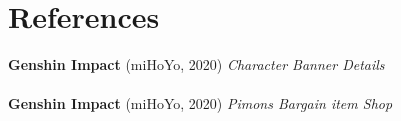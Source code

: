 \documentclass[11pt, a4paper]{article}
\begin{document}
\section{References}
\textbf{Genshin Impact} (miHoYo, 2020) \textit{Character Banner Details}
\\
\\
\textbf{Genshin Impact} (miHoYo, 2020) \textit{Pimons Bargain item Shop}
\end{document}
